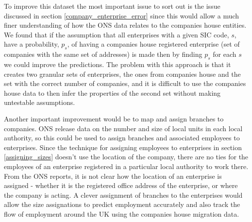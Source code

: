 \documentclass[a4paper,10pt]{article}
\begin{document}
   To improve this dataset the most important issue to sort out is the issue discussed in section \ref{company_enterprise_error} since this would allow a much finer understanding of how the ONS data relates to the companies house entities. We found that if the assumption that all enterprises with a given SIC code, $s$, have a probability, $p_s$, of having a companies house registered enterprise (set of companies with the same set of addresses) is made then by finding $p_s$ for each $s$ we could improve the predictions. The problem with this approach is that it creates two granular sets of enterprises, the ones from companies house and the set with the correct number of companies, and it is difficult to use the companies house data to then infer the properties of the second set without making untestable assumptions.

   Another important improvement would be to map and assign branches to companies. ONS release data on the number and size of local units in each local authority, so this could be used to assign branches and associated employees to enterprises. Since the technique for assigning employees to enterprises in section \ref{assigning_sizes} doesn't use the location of the company, there are no ties for the employees of an enterprise registered in a particular local authority to work there. From the ONS reports, it is not clear how the location of an enterprise is assigned - whether it is the registered office address of the enterprise, or where the company is acting. A clever assignment of branches to the enterprises would allow the size assignations to predict employment accurately and also track the flow of employment around the UK using the companies house migration data.

   \medskip
\end{document}
